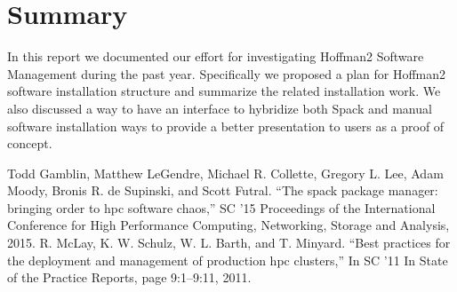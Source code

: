 \documentclass[conference]{IEEEtran}
\begin{document}
\section{Summary} \label{sec_summary}

In this report we documented our effort for investigating Hoffman2 Software Management during the past year. Specifically we proposed a plan for Hoffman2 software installation structure and summarize the related installation work. We also discussed a way to have an interface to hybridize both Spack and manual software installation ways to provide a better presentation to users as a proof of concept.

\begin{thebibliography}{00}
 Todd Gamblin, Matthew LeGendre, Michael R. Collette, Gregory L. Lee, Adam Moody, Bronis R. de Supinski, and Scott Futral. ``The spack package manager: bringing order to hpc software chaos,'' SC ’15 Proceedings of the International Conference for High Performance Computing, Networking, Storage and Analysis, 2015.
 R. McLay, K. W. Schulz, W. L. Barth, and T. Minyard. ``Best practices for the deployment and management of production hpc clusters,'' In SC ’11 In State of the Practice Reports, page 9:1–9:11, 2011.
\end{thebibliography}
\end{document}
